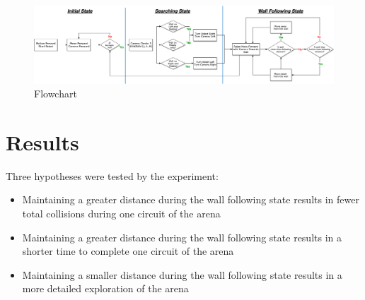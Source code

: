 \documentclass[a4paper,12pt,twocolumn]{article}
\begin{document}

\begin{figure}[ht]
\centering
\includegraphics[width=\linewidth]{figures/flowchart/System-Flowchart.png}
\caption{Flowchart}
  \label{fig:flowchart}
\end{figure}


\section{Results}
Three hypotheses were tested by the experiment:
\begin{itemize}
    \item Maintaining a greater distance during the wall following state results in fewer total collisions during one circuit of the arena
    \item Maintaining a greater distance during the wall following state results in a shorter time to complete one circuit of the arena 
     \item Maintaining a smaller distance during the wall following state results in a more detailed exploration of the arena
\end{itemize}
\end{document}
